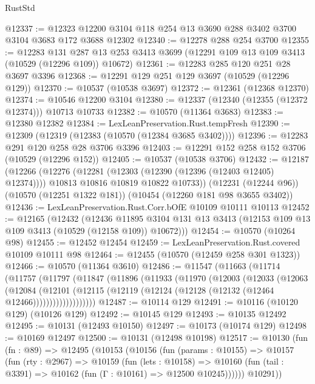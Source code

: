 \begin{lexlean}{RustStd}
\begin{coremodule}
@12337 := @12323 @12200 @3104 @118 @254 @13 @3690 @288 @3402 @3700 @3104 @3683 @172 @3688 @12302
@12340 := @12278 @288 @254 @3700
@12355 := @12283
    @131
    @287
    @13
    @253
    @3413
    @3699
    (@12291 @109 @13 @109 @3413 (@10529 (@12296 @109)) @10672)
@12361 := @12283 @285 @120 @251 @28 @3697 @3396
@12368 := @12291 @129 @251 @129 @3697 (@10529 (@12296 @129))
@12370 := @10537 (@10538 @3697)
@12372 := @12361 (@12368 @12370)
@12374 := @10546 @12200 @3104
@12380 := @12337 (@12340 (@12355 (@12372 @12374))) @10713 @10733
@12382 := @10570 (@11364 @3683)
@12383 := @12380 @12382
@12384 := LexLeanPreservation.Rust.tempFresh
@12390 := @12309 (@12319 (@12383 (@10570 (@12384 @3685 @3402))))
@12396 := @12283 @291 @120 @258 @28 @3706 @3396
@12403 := @12291 @152 @258 @152 @3706 (@10529 (@12296 @152))
@12405 := @10537 (@10538 @3706)
@12432 := @12187
    (@12266
      (@12276
        (@12281 (@12303 (@12390 (@12396 (@12403 @12405) @12374))))
        @10813
        @10816
        @10819
        @10822
        @10733))
    (@12231 (@12244 @96))
    (@10570 (@12251 @1322 @181))
    (@10454 (@12260 @181 @98 @3655 @3402))
@12436 := LexLeanPreservation.Rust.Corr.bOfE @10109 @10111 @10113
@12452 := @12165
    (@12432
      (@12436
        @11895
        @3104
        @131
        @13
        @3413
        (@12153 @109 @13 @109 @3413 (@10529 (@12158 @109)) @10672)))
@12454 := @10570 (@10264 @98)
@12455 := @12452 @12454
@12459 := LexLeanPreservation.Rust.covered @10109 @10111 @98
@12464 := @12455 (@10570 (@12459 @258 @301 @1323))
@12466 := @10570 (@11364 @3610)
@12486 := @11547
    (@11663
      (@11714
        (@11757
          (@11797
            (@11847
              (@11896
                (@11933
                  (@11970
                    (@12003
                      (@12033
                        (@12063
                          (@12084
                            (@12101
                              (@12115
                                (@12119 (@12124 (@12128 (@12132 (@12464 @12466)))))))))))))))))))
@12487 := @10114 @129
@12491 := @10116 (@10120 @129) (@10126 @129)
@12492 := @10145 @129
@12493 := @10135 @12492
@12495 := @10131 (@12493 @10150)
@12497 := @10173 (@10174 @129)
@12498 := @10169 @12497
@12500 := @10131 (@12498 @10198)
@12517 := @10130
    (fun (fn : @89) =>
    @12495
      (@10153
        (@10156
          (fun (params : @10155) =>
          @10157
            (fun (rty : @2967) =>
            @10159
              (fun (lets : @10158) =>
              @10160 (fun (tail : @3391) => @10162 (fun (Γ : @10161) => @12500 @10245))))))
        @10291))

\end{coremodule}
\end{lexlean}
